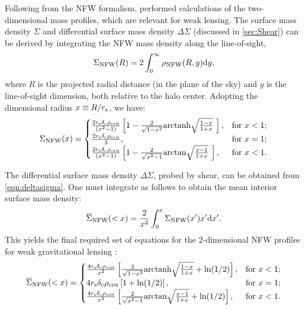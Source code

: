 Following from the \ac{NFW} formalism, \citet{Wright00} performed calculations of the two-dimensional mass profiles, which are relevant for weak lensing. The surface mass density $\Sigma$ and differential surface mass density $\Delta\Sigma$ (discussed in \autoref{sec:Shear}) can be derived by integrating the \ac{NFW} mass density along the line-of-sight,
\begin{equation}
\Sigma_{\rm NFW} (R) = 2 \int_0^{\infty} \rho_{\rm NFW} (R,y) {\rm d}y,
\end{equation}
where $R$ is the projected radial distance (in the plane of the sky) and $y$ is the line-of-sight dimension, both relative to the halo center. Adopting the dimensional radius $x \equiv R/r_{\rm s}$, we have:
\begin{equation}
\Sigma_{\rm NFW} (x) = 
    \begin{cases}
        \frac{2 r_{\rm s} \delta_{\rm c} \rho_{\rm crit}}{(x^2 - 1)} \left[ 1 - \frac{2}{\sqrt{1-x^2}} {\rm arctanh} \sqrt{\frac{1-x}{1+x}} \ \right], & \text{for } x < 1; \\
        \frac{2 r_{\rm s} \delta_{\rm c} \rho_{\rm crit}}{3},              & \text{for } x = 1; \\
        \frac{2 r_{\rm s} \delta_{\rm c} \rho_{\rm crit}}{(x^2 - 1)} \left[ 1 - \frac{2}{\sqrt{x^2 - 1}} {\rm arctan} \sqrt{\frac{x-1}{1+x}} \ \right], & \text{for } x < 1.
    \end{cases}
\end{equation}

The differential surface mass density $\Delta\Sigma$, probed by shear, can be obtained from  \autoref{eqn:deltasigma}. One must integrate as follows to obtain the mean interior surface mass density:
\begin{equation}
\overline{\Sigma}_{\rm NFW}(<x) = \frac{2}{x^2} \int_0^{x} \Sigma_{\rm NFW}(x') x' {\rm d}x'.
\end{equation}
This yields the final required set of equations for the 2-dimensional \ac{NFW} profiles for weak gravitational lensing \citep{Wright00}:
\begin{equation}
\overline{\Sigma}_{\rm NFW}(<x) = 
    \begin{cases}
        \frac{4 r_{\rm s} \delta_{\rm c} \rho_{\rm crit}}{x^2} \left[ \frac{2}{\sqrt{1-x^2}} {\rm arctanh} \sqrt{\frac{1-x}{1+x}} + {\rm ln}(1/2) \right], & \text{for } x < 1; \\
        4 r_{\rm s} \delta_{\rm c} \rho_{\rm crit} \left[ 1 + {\rm ln}(1/2) \right], & \text{for } x = 1; \\
        \frac{4 r_{\rm s} \delta_{\rm c} \rho_{\rm crit}}{x^2} \left[ \frac{2}{\sqrt{x^2 - 1}} {\rm arctan} \sqrt{\frac{x-1}{1+x}} + {\rm ln}(1/2) \right], & \text{for } x < 1.
    \end{cases}
\end{equation}

